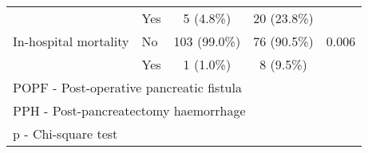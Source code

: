 \begin{table}[p]
\begin{tabular}{|l l | c c |c|}
		                         & Yes           & 5 (4.8\%)    & 20 (23.8\%)  &  \\
		In-hospital mortality    & No            & 103 (99.0\%) & 76 (90.5\%)  & 0.006          \\
		                         & Yes           & 1 (1.0\%)    & 8 (9.5\%)    &  \\ \hline
		\multicolumn{5}{l}{POPF - Post-operative pancreatic fistula}                            \\
		\multicolumn{5}{l}{PPH - Post-pancreatectomy haemorrhage}                               \\
		\multicolumn{5}{l}{p - Chi-square test}
	\end{tabular}
\end{table}
